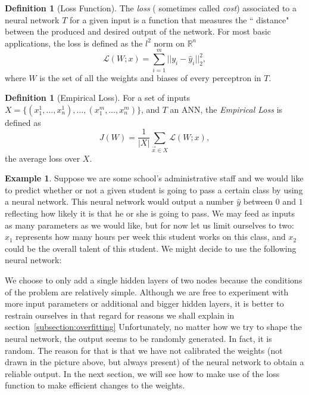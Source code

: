 \documentclass{article}
\newcommand{\R}{\mathbb{R}}
\theoremstyle{plain}
\theoremstyle{definition}
\newtheorem{definition}[thm]{Definition}
\newtheorem{example}[thm]{Example}
\theoremstyle{remark}
\begin{document}
\begin{definition}[Loss Function]
	 The \emph{loss} ( sometimes called \emph{cost})  associated to a neural network $T$ for a given input is a function that measures the `` distance" between the produced and desired output of the network. For most basic applications, the loss is defined as the $l^2$ norm on $\R^n$
	\[\mathcal{L}(W; x)= \sum_{i=1}^{m} ||y_i - \hat{y}_i||_2^2 , \]
	where $W$ is the set of all the weights and biases of every perceptron in $T$.
\end{definition}
\begin{definition}[Empirical Loss]
	For a set of inputs $X=\{(x_1^1,\dots,x_n^1), \dots , (x_1^m,\dots ,x_n^m)\}$, and $T$ an ANN, the \emph{Empirical Loss} is defined as
	\[ J(W)=\frac{1}{|X|} \sum_{\vec{x}\in X} \mathcal{L}(W;x), \]
	the average loss over $X$.
\end{definition}
\begin{example}
Suppose we are some school's administrative staff and we would like to predict whether or not a given student is going to pass a certain class by using a neural network. This neural network would output a number $\hat y$ between $0$ and $1$ reflecting how likely it is that he or she is going to pass. We may feed as inputs as many parameters as we would like, but for now let us limit ourselves to two: $x_1$ represents how many hours per week this student works on this class, and $x_2$ could be the overall talent of this student. We might decide to use the following neural network:
\begin{center}
\end{center}
We choose to only add a single hidden layers of two nodes because the conditions of the problem are relatively simple. Although we are free to experiment with more input parameters or additional and bigger hidden layers, it is better to restrain ourselves in that regard for reasons we shall explain in section~\ref{subsection:overfitting} Unfortunately, no matter how we try to shape the neural network, the output seems to be randomly generated. In fact, it is random. The reason for that is that we have not calibrated the weights (not drawn in the picture above, but always present) of the neural network to obtain a reliable output. In the next section, we will see how to make use of the loss function to make efficient changes to the weights.
\end{example}
\end{document}
